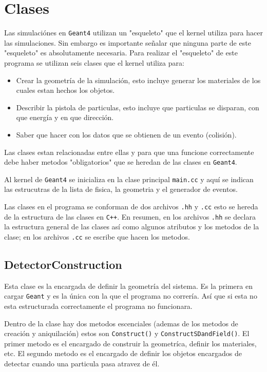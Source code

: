 \documentclass[a4paper,10pt]{article}
\begin{document}
    \section{Clases}
        Las simulaciónes en \verb|Geant4| utilizan un "esqueleto" que el kernel utiliza para hacer las simulaciones. Sin embargo es importante señalar que ninguna parte de este "esqueleto" es absolutamente necesaria.
	Para realizar el "esqueleto" de este programa se utilizan seis clases que el kernel utiliza para:
	
	\begin{itemize}
		\item Crear la geometría de la simulación, esto incluye generar los materiales de los cuales estan hechos los objetos.
		\item Describir la pistola de particulas, esto incluye que particulas se disparan, con que energía y en que dirección.
		\item Saber que hacer con los datos que se obtienen de un evento (colisión).
	\end{itemize}

	Las clases estan relacionadas entre ellas y para que una funcione correctamente debe haber metodos "obligatorios" que se heredan de las clases en \verb|Geant4|.

	Al kernel de \verb|Geant4| se inicializa en la clase principal \verb|main.cc| y aquí se indican las estrucutras de la lista de fisica, la geometria y el generador de eventos.

	Las clases en el programa se conforman de dos archivos \verb|.hh| y \verb|.cc| esto se hereda de la estructura de las clases en \verb|C++|. En resumen, en los archivos \verb|.hh| se declara la estructura general de las clases así como algunos atributos y los metodos de la clase; en los archivos \verb|.cc| se escribe que hacen los metodos.
	
	\subsection{ DetectorConstruction }

		Esta clase es la encargada de definir la geometría del sistema. Es la primera en cargar \verb|Geant| y es la única con la que el programa no correría. Así que si esta no esta estructurada correctamente el programa no funcionara.
		
		Dentro de la clase hay dos metodos escenciales (ademas de los metodos de creación y aniquilación) estos son \verb|Construct()| y \verb|ConstructSDandField()|. El primer metodo es el encargado de construir la geometríca, definir los materiales, etc. El segundo metodo es el encargado de definir los objetos encargados de detectar cuando una particula pasa atravez de él.
\end{document}
